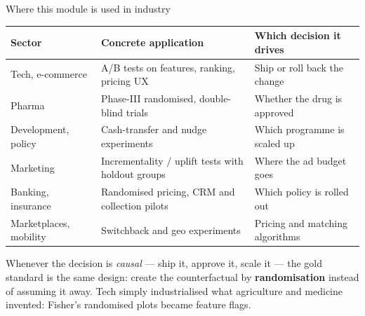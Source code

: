 \documentclass[aspectratio=169,11pt]{beamer}
\begin{document}
\begin{frame}{Where this module is used in industry}
  \scriptsize
  \begin{center}
  \begin{tabular}{@{}p{2.9cm}p{5.2cm}p{4.4cm}@{}}
    \toprule
    \textbf{Sector} & \textbf{Concrete application} & \textbf{Which decision it drives} \\
    \midrule
    Tech, e-commerce & A/B tests on features, ranking, pricing UX & Ship or roll back the change \\
    Pharma & Phase-III randomised, double-blind trials & Whether the drug is approved \\
    Development, policy & Cash-transfer and nudge experiments & Which programme is scaled up \\
    Marketing & Incrementality / uplift tests with holdout groups & Where the ad budget goes \\
    Banking, insurance & Randomised pricing, CRM and collection pilots & Which policy is rolled out \\
    Marketplaces, mobility & Switchback and geo experiments & Pricing and matching algorithms \\
    \bottomrule
  \end{tabular}
  \end{center}
  \begin{industry}
    Whenever the decision is \emph{causal} --- ship it, approve it, scale it --- the gold
    standard is the same design: create the counterfactual by \textbf{randomisation}
    instead of assuming it away. Tech simply industrialised what agriculture and medicine
    invented: Fisher's randomised plots became feature flags.
  \end{industry}
\end{frame}
\end{document}
